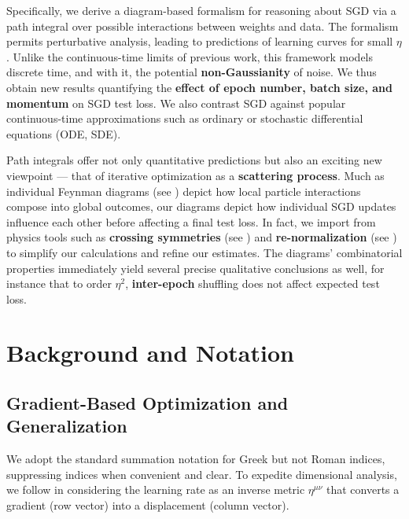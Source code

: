 \documentclass{article}
\begin{document}
    Specifically, we derive a diagram-based formalism for reasoning about SGD
    via a path integral over possible interactions between weights and data.
    The formalism permits perturbative analysis, leading to predictions of
    learning curves for small $\eta$.  Unlike the continuous-time limits of
    previous work, this framework models discrete time, and with it, the
    potential {\bf non-Gaussianity} of noise.  We thus obtain new results
    quantifying the {\bf effect of epoch number, batch size, and momentum} on
    SGD test loss.  We also contrast SGD against popular continuous-time
    approximations such as ordinary or stochastic differential equations (ODE,
    SDE).
    
    Path integrals offer not only quantitative predictions but also an exciting
    new viewpoint --- that of iterative optimization as a {\bf scattering
    process}.  Much as individual Feynman diagrams (see \citet{dy49a}) depict
    how local particle interactions compose into global outcomes, our diagrams
    depict how individual SGD updates influence each other before affecting a
    final test loss.  In fact, we import from physics tools such as {\bf
    crossing symmetries} (see \citet{dy49b}) and {\bf re-normalization} (see
    \citet{ge54}) to simplify our calculations and refine our estimates.
    The diagrams' combinatorial properties immediately yield several precise
    qualitative conclusions as well, for instance that to order $\eta^2$, {\bf
    inter-epoch} shuffling does not affect expected test loss.


\section{Background and Notation}

\subsection{Gradient-Based Optimization and Generalization}
    We adopt the standard summation notation for Greek but not Roman indices,
    suppressing indices when convenient and clear.  To expedite dimensional
    analysis, we follow \cite{bo13} in considering the learning rate as an
    inverse metric $\eta^{\mu\nu}$ that converts a gradient (row vector) into a
    displacement (column vector).
\end{document}
